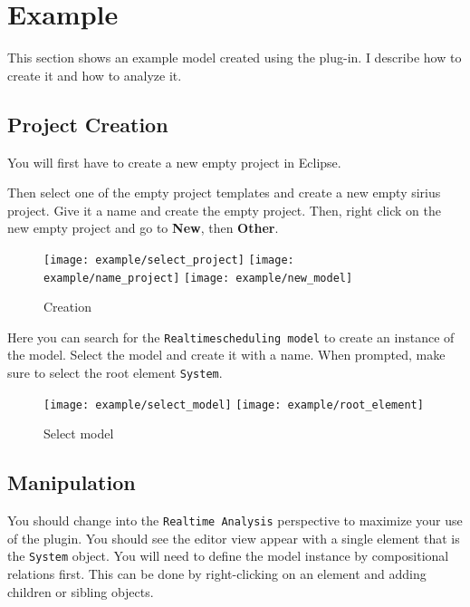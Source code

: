 \pagebreak
\section{Example}
This section shows an example model created using the plug-in. I describe
how to create it and how to analyze it.
\subsection{Project Creation}
You will first have to create a new empty project in Eclipse.


Then select one of the empty project templates and create
a new empty sirius project. Give it a name and create the
empty project. Then, right click on the new empty project
and go to \textbf{New}, then \textbf{Other}. 
\begin{figure}[H]
    \centering
    \texttt{[image: example/select\_project]}
    \texttt{[image: example/name\_project]}
    \texttt{[image: example/new\_model]}
    \caption{Creation}
\end{figure}

Here you can search for the \texttt{Realtimescheduling model} to create
an instance of the model. Select the model and create it with a name.
When prompted, make sure to select the root element \texttt{System}.
\begin{figure}[H]
    \centering
    \texttt{[image: example/select\_model]}
    \texttt{[image: example/root\_element]}
    \caption{Select model}
\end{figure}

\subsection{Manipulation}
You should change into the \texttt{Realtime Analysis} perspective to
maximize your use of the plugin. You should see the editor view appear
with a single element that is the \texttt{System} object. You will need
to define the model instance by compositional relations first. This
can be done by right-clicking on an element and adding children or sibling
objects.

